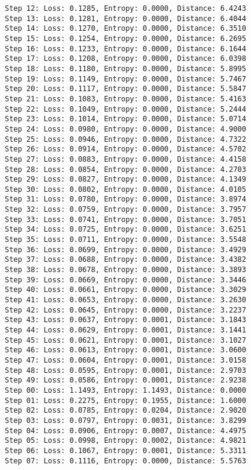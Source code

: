 \documentclass[11pt]{article}
\begin{document}
\begin{Verbatim}[commandchars=\\\{\}]
Step 12: Loss: 0.1285, Entropy: 0.0000, Distance: 6.4243
Step 13: Loss: 0.1281, Entropy: 0.0000, Distance: 6.4044
Step 14: Loss: 0.1270, Entropy: 0.0000, Distance: 6.3510
Step 15: Loss: 0.1254, Entropy: 0.0000, Distance: 6.2695
Step 16: Loss: 0.1233, Entropy: 0.0000, Distance: 6.1644
Step 17: Loss: 0.1208, Entropy: 0.0000, Distance: 6.0398
Step 18: Loss: 0.1180, Entropy: 0.0000, Distance: 5.8995
Step 19: Loss: 0.1149, Entropy: 0.0000, Distance: 5.7467
Step 20: Loss: 0.1117, Entropy: 0.0000, Distance: 5.5847
Step 21: Loss: 0.1083, Entropy: 0.0000, Distance: 5.4163
Step 22: Loss: 0.1049, Entropy: 0.0000, Distance: 5.2444
Step 23: Loss: 0.1014, Entropy: 0.0000, Distance: 5.0714
Step 24: Loss: 0.0980, Entropy: 0.0000, Distance: 4.9000
Step 25: Loss: 0.0946, Entropy: 0.0000, Distance: 4.7322
Step 26: Loss: 0.0914, Entropy: 0.0000, Distance: 4.5702
Step 27: Loss: 0.0883, Entropy: 0.0000, Distance: 4.4158
Step 28: Loss: 0.0854, Entropy: 0.0000, Distance: 4.2703
Step 29: Loss: 0.0827, Entropy: 0.0000, Distance: 4.1349
Step 30: Loss: 0.0802, Entropy: 0.0000, Distance: 4.0105
Step 31: Loss: 0.0780, Entropy: 0.0000, Distance: 3.8974
Step 32: Loss: 0.0759, Entropy: 0.0000, Distance: 3.7957
Step 33: Loss: 0.0741, Entropy: 0.0000, Distance: 3.7051
Step 34: Loss: 0.0725, Entropy: 0.0000, Distance: 3.6251
Step 35: Loss: 0.0711, Entropy: 0.0000, Distance: 3.5548
Step 36: Loss: 0.0699, Entropy: 0.0000, Distance: 3.4929
Step 37: Loss: 0.0688, Entropy: 0.0000, Distance: 3.4382
Step 38: Loss: 0.0678, Entropy: 0.0000, Distance: 3.3893
Step 39: Loss: 0.0669, Entropy: 0.0000, Distance: 3.3446
Step 40: Loss: 0.0661, Entropy: 0.0000, Distance: 3.3029
Step 41: Loss: 0.0653, Entropy: 0.0000, Distance: 3.2630
Step 42: Loss: 0.0645, Entropy: 0.0000, Distance: 3.2237
Step 43: Loss: 0.0637, Entropy: 0.0001, Distance: 3.1843
Step 44: Loss: 0.0629, Entropy: 0.0001, Distance: 3.1441
Step 45: Loss: 0.0621, Entropy: 0.0001, Distance: 3.1027
Step 46: Loss: 0.0613, Entropy: 0.0001, Distance: 3.0600
Step 47: Loss: 0.0604, Entropy: 0.0001, Distance: 3.0158
Step 48: Loss: 0.0595, Entropy: 0.0001, Distance: 2.9703
Step 49: Loss: 0.0586, Entropy: 0.0001, Distance: 2.9238
Step 00: Loss: 1.1493, Entropy: 1.1493, Distance: 0.0000
Step 01: Loss: 0.2275, Entropy: 0.1955, Distance: 1.6000
Step 02: Loss: 0.0785, Entropy: 0.0204, Distance: 2.9020
Step 03: Loss: 0.0797, Entropy: 0.0031, Distance: 3.8299
Step 04: Loss: 0.0906, Entropy: 0.0007, Distance: 4.4975
Step 05: Loss: 0.0998, Entropy: 0.0002, Distance: 4.9821
Step 06: Loss: 0.1067, Entropy: 0.0001, Distance: 5.3311
Step 07: Loss: 0.1116, Entropy: 0.0000, Distance: 5.5763

\end{Verbatim}
\end{document}

